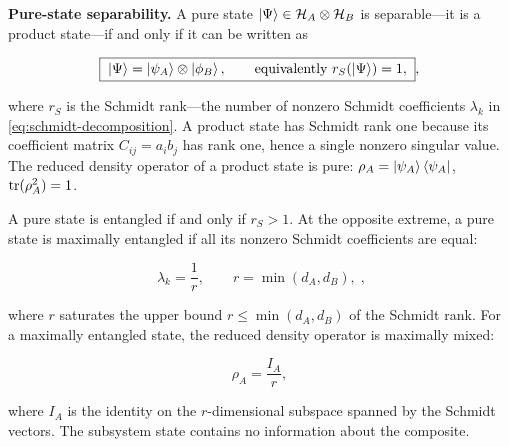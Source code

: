 \medskip\noindent\textbf{Pure-state separability.}
A pure state $\ket{\Psi} \in \mathcal{H}_A \otimes \mathcal{H}_B$ is separable---it is a product state---if and only if it can be written as
\begin{linenomath}
\begin{equation}
\boxed{\;
\ket{\Psi} = \ket{\psi_A} \otimes \ket{\phi_B},
\qquad
\text{equivalently } r_S(\ket{\Psi}) = 1,
\;},
\label{eq:separable-pure}
\end{equation}
\end{linenomath}
where $r_S$ is the Schmidt rank---the number of nonzero Schmidt coefficients $\lambda_k$ in \eqref{eq:schmidt-decomposition}. A product state has Schmidt rank one because its coefficient matrix $C_{ij} = a_i b_j$ has rank one, hence a single nonzero singular value. The reduced density operator of a product state is pure: $\rho_A = \ket{\psi_A}\bra{\psi_A}$, $\mathrm{tr}(\rho_A^2) = 1$.

A pure state is entangled if and only if $r_S > 1$. At the opposite extreme, a pure state is maximally entangled if all its nonzero Schmidt coefficients are equal:
\begin{linenomath}
\begin{equation}
\boxed{\;
\lambda_k = \frac{1}{r},
\qquad
r = \min(d_A, d_B),
\;},
\label{eq:max-entangled-condition}
\end{equation}
\end{linenomath}
where $r$ saturates the upper bound $r \le \min(d_A, d_B)$ of the Schmidt rank. For a maximally entangled state, the reduced density operator is maximally mixed:
\begin{linenomath}
\begin{equation}
\rho_A = \frac{I_A}{r},
\end{equation}
\end{linenomath}
where $I_A$ is the identity on the $r$-dimensional subspace spanned by the Schmidt vectors. The subsystem state contains no information about the composite.

